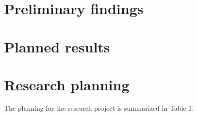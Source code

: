 \documentclass{sig-alternate-br}
\begin{document}
\section{Preliminary findings}

\section{Planned results}

\section{Research planning}
The planning for the research project is summarized in Table 1.%

\flushcolsend

\end{document}
